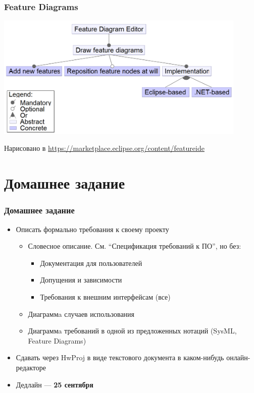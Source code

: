 \documentclass[xetex,mathserif,serif]{beamer}
\begin{document}
	\begin{frame}
		\frametitle{Feature Diagrams}
		\begin{center}
			\includegraphics[width=0.9\textwidth]{featureDiagram.png}
		\end{center}
		\begin{footnotesize}
			Нарисовано в \url{https://marketplace.eclipse.org/content/featureide}
		\end{footnotesize}
	\end{frame}

	\section{Домашнее задание}

	\begin{frame}
		\frametitle{Домашнее задание}
		\begin{itemize}
			\item Описать формально требования к своему проекту
			\begin{itemize}
				\item Словесное описание. См. ``Спецификация требований к ПО'', но без:
				\begin{itemize}
					\item Документация для пользователей
					\item Допущения и зависимости
					\item Требования к внешним интерфейсам (все)
				\end{itemize}
				\item Диаграммa случаев использования
				\item Диаграммa требований в одной из предложенных нотаций (SysML, Feature Diagrams)
			\end{itemize}
			\item Сдавать через HwProj в виде текстового документа в каком-нибудь онлайн-редакторе
			\item Дедлайн --- \textbf{25 сентября}
		\end{itemize}
	\end{frame}
\end{document}
